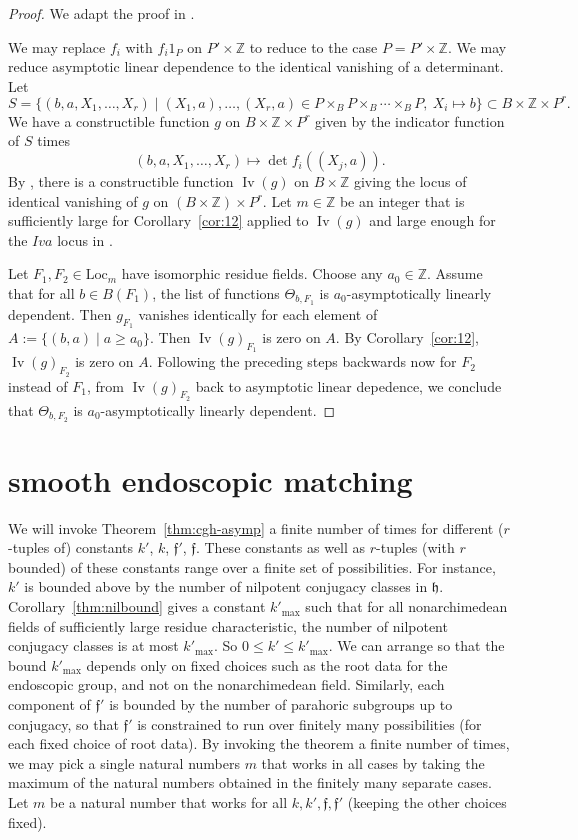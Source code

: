 \documentclass[12pt]{amsart}
\newcommand{\op}[1]{\operatorname{#1}}
\newcommand{\ring}[1]{{\mathbb #1}}
\newcommand{\locus}[1]{\op{Iv}(#1)}
\def\s{{\mathfrak{f}}}
\newcommand{\fh}{\mathfrak{h}}
\newcommand{\Loc}{\mathrm{Loc}}
\theoremstyle{plain}
\theoremstyle{definition}
\begin{document}
\begin{proof} We adapt the proof in \cite{CGH2}.

We may replace $f_i$ with $f_i 1_P$ on $P'\times\ring{Z}$ to reduce
to the case $P=P'\times\ring{Z}$.  We may reduce asymptotic linear
dependence to the identical vanishing of a determinant.
Let 
\[
S = \{(b,a,X_1,\ldots,X_r)\mid (X_1,a),\ldots,(X_r,a)\in P\times_B
P\times_B\cdots\times_B P,~X_i\mapsto b\} \subset B\times\ring{Z}\times P^r.
\]
We have a constructible function $g$ on $B\times\ring{Z}\times P^r$
given by the indicator function of $S$ times
\[
(b,a,X_1,\ldots,X_r)\mapsto 
\det f_i((X_j,a)).
\]
By \cite{CGH1}, there is a constructible function $\locus{g}$ on
$B\times\ring{Z}$ giving the locus of identical vanishing of $g$ on
$(B\times\ring{Z})\times P^r$.
Let $m\in\ring{Z}$ be an integer that is sufficiently large for
Corollary~\ref{cor:12} applied to $\locus{g}$ and large enough for the
$Iva$ locus in \cite{CGH1}.

Let $F_1,F_2\in\Loc_m$ have isomorphic residue fields.  Choose any
$a_0\in\ring{Z}$.  Assume that for all $b\in B(F_1)$, the list of
functions $\Theta_{b,F_1}$ is $a_0$-asymptotically linearly dependent.
Then $g_{F_1}$ vanishes identically for each element of $A:=\{(b,a)\mid
a\ge a_0\}$.  Then $\locus{g}_{F_1}$ is zero on $A$.  By
Corollary~\ref{cor:12}, $\locus{g}_{F_2}$ is zero on $A$.  Following
the preceding steps backwards now for $F_2$ instead of $F_1$, from
$\locus{g}_{F_2}$ back to asymptotic linear depedence, we conclude that
$\Theta_{b,F_2}$ is $a_0$-asymptotically linearly dependent.
\end{proof}



\section{smooth endoscopic matching}


We will invoke Theorem~\ref{thm:cgh-asymp} a finite number of times for different
($r$-tuples of) constants $k'$, $k$, $\s'$, $\s$.  These constants as
well as $r$-tuples (with $r$ bounded) of these constants range over a
finite set of possibilities.  For instance, $k'$ is bounded above by
the number of nilpotent conjugacy classes in $\fh$.  Corollary~\ref{thm:nilbound}
gives a
constant $k'_{\op{max}}$ such that for all nonarchimedean fields of
sufficiently large residue characteristic, the number of nilpotent
conjugacy classes is at most $k'_{\op{max}}$.  So $0\le k'\le
k'_{\op{max}}$.  We can arrange so that the bound $k'_{\op{max}}$
depends only on fixed choices such as the root data for the endoscopic
group, and not on the nonarchimedean field.  Similarly, each component
of $\s'$ is bounded by the number of parahoric subgroups up to
conjugacy, so that $\s'$ is constrained to run over finitely many
possibilities (for each fixed choice of root data). By invoking the
theorem a finite number of times, we may pick a single natural numbers
$m$ that works in all cases by taking the maximum of the natural
numbers obtained in the finitely many separate cases.  Let $m$ be a
natural number that works for all $k,k',\s,\s'$ (keeping the other
choices fixed).
\end{document}
